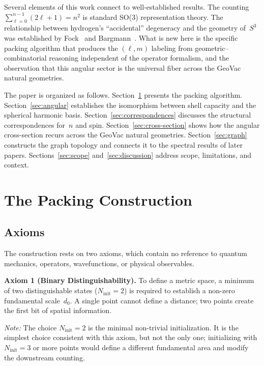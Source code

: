 \documentclass[aps,prl,reprint,amsmath,amssymb]{revtex4-2}
\begin{document}
\medskip

Several elements of this work connect to well-established results.
The counting $\sum_{\ell=0}^{n-1}(2\ell+1) = n^2$ is standard SO(3)
representation theory.  The relationship between hydrogen's
``accidental'' degeneracy and the geometry of~$S^3$ was established by
Fock~\cite{fock1935} and Bargmann~\cite{bargmann1936}.  What is new
here is the specific packing algorithm that produces the $(\ell, m)$
labeling from geometric--combinatorial reasoning independent of the
operator formalism, and the observation that this angular sector is
the universal fiber across the GeoVac natural geometries.

The paper is organized as follows.
Section~\ref{sec:construction} presents the packing algorithm.
Section~\ref{sec:angular} establishes the isomorphism between shell
capacity and the spherical harmonic basis.
Section~\ref{sec:correspondences} discusses the structural
correspondences for~$n$ and spin.
Section~\ref{sec:cross-section} shows how the angular cross-section
recurs across the GeoVac natural geometries.
Section~\ref{sec:graph} constructs the graph topology and connects it
to the spectral results of later papers.
Sections~\ref{sec:scope} and~\ref{sec:discussion} address scope,
limitations, and context.


\section{The Packing Construction}
\label{sec:construction}

\subsection{Axioms}

The construction rests on two axioms, which contain no reference to
quantum mechanics, operators, wavefunctions, or physical observables.

\medskip

\noindent\textbf{Axiom 1 (Binary Distinguishability).}
To define a metric space, a minimum of two distinguishable states
($N_{\mathrm{init}} = 2$) is required to establish a non-zero
fundamental scale~$d_0$.  A single point cannot define a distance; two
points create the first bit of spatial information.

\textit{Note:} The choice $N_{\mathrm{init}} = 2$ is the minimal
non-trivial initialization.  It is the simplest choice consistent with
this axiom, but not the only one; initializing with $N_{\mathrm{init}} = 3$
or more points would define a different fundamental area and modify the
downstream counting.
\end{document}
